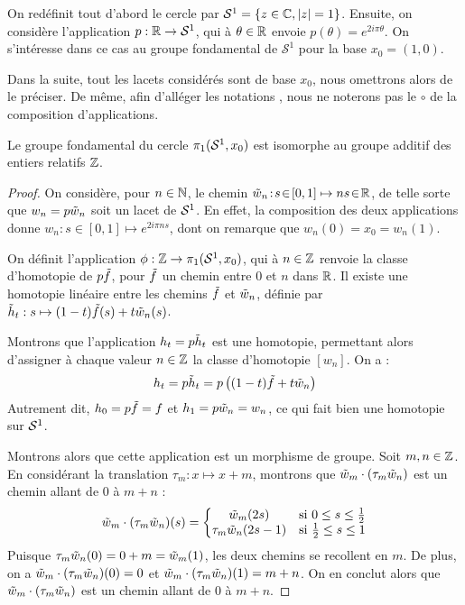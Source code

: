 \documentclass[hidelinks, 10pt]{article}
\begin{document}
On redéfinit tout d'abord le cercle par $\mathcal{S}^1=\{z\in\mathbb{C},|z|=1\}$. Ensuite, on considère l'application $p:\mathbb{R}\rightarrow\mathcal{S}^{1}$, qui à $\theta\in\mathbb{R}$ envoie $p(\theta)=e^{2i\pi\theta}$. On s'intéresse dans ce cas au groupe fondamental de $\mathcal{S}^1$ pour la base $x_0=(1,0)$. 

Dans la suite, tout les lacets considérés sont de base $x_0$, nous omettrons alors de le préciser. De même, afin d'alléger les notations , nous ne noterons pas le $\circ$ de la composition d'applications.

\begin{theorem}
Le groupe fondamental du cercle $\pi_1(\mathcal{S}^{1},x_0)$ est isomorphe au groupe additif des entiers relatifs $\mathbb{Z}$.
\end{theorem}
\begin{proof}
On considère, pour $n\in\mathbb{N}$, le chemin $\Tilde{w}_n\!:\!s\!\in\![0,1]\mapsto ns\!\in\!\mathbb{R}$, de telle sorte que $w_n=p\Tilde{w}_n$ soit un lacet de $\mathcal{S}^{1}$. En effet, la composition des deux applications donne $w_n:s\in[0,1]\mapsto e^{2i\pi ns}$, dont on remarque que $w_n(0)\!=\!x_0\!=\!w_n(1)$.

\bigskip On définit l'application $\phi:\mathbb{Z}\rightarrow\pi_1(\mathcal{S}^{1},x_0)$, qui à $n\in\mathbb{Z}$ renvoie la classe d'homotopie de $p\Tilde{f}$, pour $\Tilde{f}$ un chemin entre $0$ et $n$ dans $\mathbb{R}$. Il existe une homotopie linéaire entre les chemins $\Tilde{f}$ et $\Tilde{w}_n$, définie par $\Tilde{h}_t:s\mapsto (1-t)\Tilde{f}(s)+t\Tilde{w}_n(s)$.

Montrons que l'application $h_t=p\Tilde{h}_t$ est une homotopie, permettant alors d'assigner à chaque valeur $n\in\mathbb{Z}$ la classe d'homotopie $[w_n]$. On a : \[h_t=p\Tilde{h}_t=p\left((1-t)\Tilde{f}+t\Tilde{w}_n\right)\]Autrement dit, $h_0=p\Tilde{f}=f$ et $h_1=p\Tilde{w}_n=w_n$, ce qui fait bien une homotopie sur $\mathcal{S}^{1}$.

\bigskip Montrons alors que cette application est un morphisme de groupe. Soit $m,n\in\mathbb{Z}$. En considérant la translation $\tau_m:x\mapsto x+m$, montrons que  $\Tilde{w}_m\cdot(\tau_m\Tilde{w}_n)$ est un chemin allant de 0 à $m+n$ : \[\Tilde{w}_m\cdot(\tau_m\Tilde{w}_n)(s)=\left\{\begin{matrix}
\Tilde{w}_m(2s) &\text{si }0\leq s\leq\frac{1}{2} \\ 
\tau_m\Tilde{w}_n(2s-1) &\text{si }\frac{1}{2}\leq s\leq 1
\end{matrix}\right.\]Puisque $\tau_m\Tilde{w}_n(0)=0+m=\Tilde{w}_m(1)$, les deux chemins se recollent en $m$. De plus, on a $\Tilde{w}_m\cdot(\tau_m\Tilde{w}_n)(0)=0$ et $\Tilde{w}_m\cdot(\tau_m\Tilde{w}_n)(1)=m+n$. On en conclut alors que $\Tilde{w}_m\cdot(\tau_m\Tilde{w}_n)$ est un chemin allant de 0 à $m+n$.


\end{proof}
\end{document}

